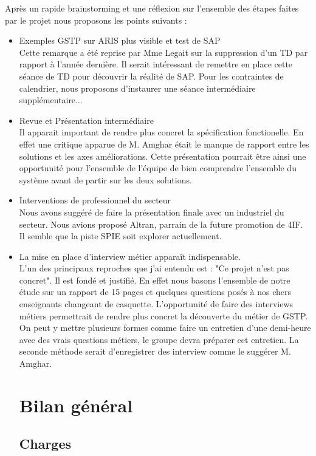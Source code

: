 Après un rapide brainstorming et une réflexion sur l'ensemble des étapes faites 
par le projet nous proposons les points suivants : 

\begin{itemize}
\item Exemples GSTP sur ARIS plus visible et test de SAP\\ 
Cette remarque a été reprise par Mme Legait sur la suppression d'un TD par rapport à 
l'année dernière. Il serait intéressant de remettre en place cette séance de TD 
pour découvrir la réalité de SAP. Pour les contraintes de calendrier, nous 
proposons d'instaurer une séance intermédiaire supplémentaire...
\item Revue et Présentation intermédiaire \\
Il apparait important de rendre plus concret la spécification fonctionelle. 
En effet une critique apparue de M. Amghar était le manque de rapport entre 
les solutions et les axes améliorations. Cette présentation pourrait être ainsi 
une opportunité pour l'ensemble de l'équipe de bien comprendre l'ensemble du système
 avant de partir sur les deux solutions.
\item Interventions de professionnel du secteur\\
Nous avons suggéré de faire la présentation finale avec un industriel du secteur. 
Nous avions proposé Altran, parrain de la future promotion de 4IF. 
Il semble que la piste SPIE soit explorer actuellement.
\item La mise en place d'interview métier apparaît indispensable. \\
L'un des principaux reproches que j'ai entendu est : "Ce projet n'est pas concret". 
Il est fondé et justifié. En effet nous basons l'ensemble de notre étude sur un 
rapport de 15 pages et quelques questions posés à nos chers enseignants 
changeant de casquette. L'opportunité de faire des interviews métiers 
permettrait de rendre plus concret la découverte du métier de GSTP. \\
On peut y mettre plusieurs formes comme faire un entretien d'une demi-heure avec 
des vrais questions métiers, le groupe devra préparer cet entretien. La seconde
méthode serait d'enregistrer des interview comme le suggérer M. Amghar.

\section{Bilan général}

\subsection{Charges}

\end{itemize}
